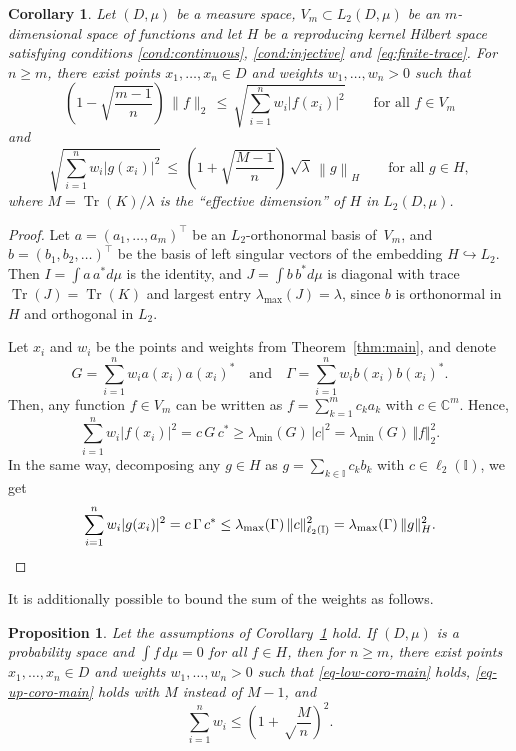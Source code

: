 \documentclass[a4paper,11pt]{article}
\renewcommand{\(}{\left (}
\renewcommand{\)}{\right )}
\newcommand{\<}{\langle}
\renewcommand{\>}{\rangle}
\newcommand{\C}{\mathbb{C}}
\newcommand{\II}{\mathbb{I}}
\newtheorem{coro}[theorem]{Corollary}
\newtheorem{prop}[theorem]{Proposition}
\theoremstyle{definition}
\DeclareMathOperator{\Tr}{Tr}
\begin{document}
\begin{coro} \label{coro:main}
Let $(D,\mu)$ be a measure space, 
$V_m\subset L_2(D,\mu)$ be an $m$-dimensional space of functions and let $H$ be 
a reproducing kernel Hilbert space satisfying conditions \eqref{cond:continuous}, \eqref{cond:injective} and \eqref{eq:finite-trace}. 
For $n\geq m$, there exist points $x_1,\dots,x_n\in D$ and weights ${w_1,\dots,w_n>0}$ such that
\begin{equation}
\label{eq-low-coro-main}
\left(1-\sqrt{\frac{m-1}{n}}\right)\,\|f\|_2
\,\leq\,
\sqrt{\sum_{i=1}^n w_i|f(x_i)|^2}
\qquad \text{for all } f \in V_m
\end{equation}
and 
\begin{equation}
\label{eq-up-coro-main}
\sqrt{\sum_{i=1}^n w_i|g(x_i)|^2}
\,\leq\,
\left(1 +\sqrt{\frac{M-1}{n}} \right)\, \sqrt\lambda\,
\left\| g \right\|_H
\qquad \text{for all } g \in H,
\end{equation}
where $M=\Tr(K)/\lambda$ is the ``effective dimension'' of $H$ in $L_2(D,\mu)$.
\end{coro}

\begin{proof}
Let $a=(a_1,\hdots,a_m)^\top$ be an $L_2$-orthonormal basis of~$V_m$,
and $b=(b_1,b_2,\hdots)^\top$ be the basis of left singular vectors of the embedding $ H\hookrightarrow L_2$.
Then $I=\int a\,a^*d\mu$ is the identity, and
$J=\int b\,b^*d\mu$
is diagonal with trace $\Tr(J) =\Tr(K)$ and largest entry $\lambda_{\max}(J) = \lambda$,
since $b$ is orthonormal in $H$ and orthogonal in $L_2$.

Let $x_i$ and $w_i$ be the points and weights from Theorem~\ref{thm:main}, and denote
\[
G=\sum_{i=1}^{n} w_ia(x_i)a(x_i)^*\quad\text{and}\quad
\Gamma = \sum_{i=1}^{n} w_ib(x_i)b(x_i)^*.
\]
Then, any function $f\in V_m$ can be written as $f=\sum_{k=1}^{m} c_k a_k$ 
with $c\in \C^m$. Hence,
\[
 \sum_{i=1}^n w_i|f(x_i)|^2 = c\,G\,c^*
\geq \lambda_{\min}(G)\,|c|^2
 =\lambda_{\min}(G)\,\Vert f\Vert_2^2.
\]
In the same way, decomposing any $g\in H$ as $g=\sum_{k\in \mathbb I} c_k b_k$ with $c\in \ell_2(\II)$, we get\vspace{-4mm}
\[
 \sum_{i=1}^n w_i|g(x_i)|^2 = c\,\Gamma\,c^*
 \leq \lambda_{\max}(\Gamma)\,\Vert c \Vert_{\ell_2(\II)}^2
 =\lambda_{\max}(\Gamma)\,\Vert g \Vert_{H}^2.\qedhere
\]
\end{proof}

It is additionally possible to bound the sum of the weights as follows.
\begin{prop}
\label{rk:weight_control}
Let the assumptions of Corollary~\ref{coro:main} hold.
If $(D,\mu)$ is a probability space and $\int f\,d\mu=0$ for all $f\in H$,
then for $n\geq m$, there exist points $x_1,\dots,x_n\in D$ and weights ${w_1,\dots,w_n>0}$ 
such that \eqref{eq-low-coro-main} holds, \eqref{eq-up-coro-main} holds with $M$ instead of $M-1$, and 
\[
\sum_{i=1}^n w_i \leq \left(1+\sqrt\frac{M}{n}\right)^2.
\]
\end{prop}
\end{document}
